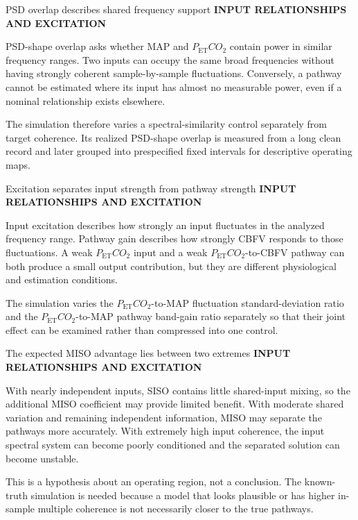 \documentclass[aspectratio=169,11pt]{beamer}
\newcommand{\PETCOtwo}{P_{\mathrm{ET}}CO_2}
\newcommand{\sectionlabel}[1]{%
  {\color{Accent}\fontsize{8}{9.5}\selectfont\bfseries\MakeUppercase{#1}}\par\vspace{0.12cm}}
\begin{document}
\begin{frame}{PSD overlap describes shared frequency support}
\sectionlabel{Input Relationships and Excitation}
PSD-shape overlap asks whether MAP and $\PETCOtwo$ contain power in similar
frequency ranges. Two inputs can occupy the same broad frequencies without
having strongly coherent sample-by-sample fluctuations. Conversely, a pathway
cannot be estimated where its input has almost no measurable power, even if a
nominal relationship exists elsewhere.

\vspace{0.45cm}
The simulation therefore varies a spectral-similarity control separately from
target coherence. Its realized PSD-shape overlap is measured from a long clean
record and later grouped into prespecified fixed intervals for descriptive
operating maps.
\end{frame}

\begin{frame}{Excitation separates input strength from pathway strength}
\sectionlabel{Input Relationships and Excitation}
Input excitation describes how strongly an input fluctuates in the analyzed
frequency range. Pathway gain describes how strongly CBFV responds to those
fluctuations. A weak $\PETCOtwo$ input and a weak $\PETCOtwo$-to-CBFV pathway can
both produce a small output contribution, but they are different physiological
and estimation conditions.

\vspace{0.45cm}
The simulation varies the $\PETCOtwo$-to-MAP fluctuation standard-deviation
ratio and the $\PETCOtwo$-to-MAP pathway band-gain ratio separately so that their
joint effect can be examined rather than compressed into one control.
\end{frame}

\begin{frame}{The expected MISO advantage lies between two extremes}
\sectionlabel{Input Relationships and Excitation}
With nearly independent inputs, SISO contains little shared-input mixing, so the
additional MISO coefficient may provide limited benefit. With moderate shared
variation and remaining independent information, MISO may separate the pathways
more accurately. With extremely high input coherence, the input spectral system can
become poorly conditioned and the separated solution can become unstable.

\vspace{0.45cm}
This is a hypothesis about an operating region, not a conclusion. The
known-truth simulation is needed because a model that looks plausible or has
higher in-sample multiple coherence is not necessarily closer to the true
pathways.
\end{frame}
\end{document}
